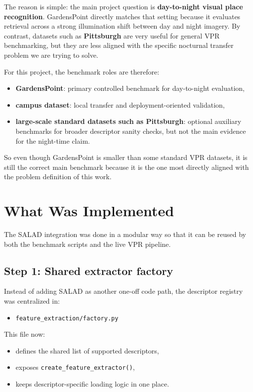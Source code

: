 \documentclass[11pt]{article}
\begin{document}
The reason is simple: the main project question is \textbf{day-to-night visual place recognition}. GardensPoint directly matches that setting because it evaluates retrieval across a strong illumination shift between day and night imagery. By contrast, datasets such as \textbf{Pittsburgh} are very useful for general VPR benchmarking, but they are less aligned with the specific nocturnal transfer problem we are trying to solve.

For this project, the benchmark roles are therefore:
\begin{itemize}[leftmargin=*]
  \item \textbf{GardensPoint}: primary controlled benchmark for day-to-night evaluation,
  \item \textbf{campus dataset}: local transfer and deployment-oriented validation,
  \item \textbf{large-scale standard datasets such as Pittsburgh}: optional auxiliary benchmarks for broader descriptor sanity checks, but not the main evidence for the night-time claim.
\end{itemize}

So even though GardensPoint is smaller than some standard VPR datasets, it is still the correct main benchmark because it is the one most directly aligned with the problem definition of this work.

\section*{What Was Implemented}
The SALAD integration was done in a modular way so that it can be reused by both the benchmark scripts and the live VPR pipeline.

\subsection*{Step 1: Shared extractor factory}
Instead of adding SALAD as another one-off code path, the descriptor registry was centralized in:
\begin{itemize}[leftmargin=*]
  \item \texttt{feature\_extraction/factory.py}
\end{itemize}

This file now:
\begin{itemize}[leftmargin=*]
  \item defines the shared list of supported descriptors,
  \item exposes \texttt{create\_feature\_extractor()},
  \item keeps descriptor-specific loading logic in one place.
\end{itemize}
\end{document}
